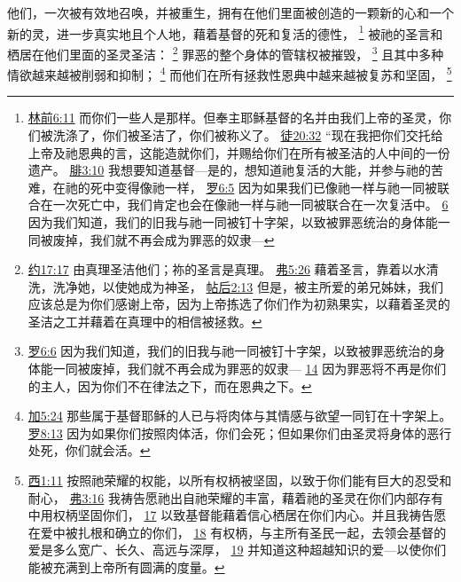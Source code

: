 \documentclass[12pt, a4paper, oneside]{ctexart}
\newcounter{parnum}[section]
\newcommand{\N}{%
   \noindent\refstepcounter{parnum}%
    \makebox[\parindent][l]{\textbf{\arabic{parnum}.}}}
\begin{document}
\N 他们，一次被有效地召唤，并被重生，拥有在他们里面被创造的一颗新的心和一个新的灵，进一步真实地且个人地，藉着基督的死和复活的德性，
	\footnote {
		\href{https://biblehub.com/1_corinthians/6-11.htm}{林前6:11} 而你们一些人是那样。但奉主耶稣基督的名并由我们上帝的圣灵，你们被洗涤了，你们被圣洁了，你们被称义了。
		\href{https://biblehub.com/acts/20-32.htm}{徒20:32} “现在我把你们交托给上帝及祂恩典的言，这能造就你们，并赐给你们在所有被圣洁的人中间的一份遗产。
		\href{https://biblehub.com/philippians/3-10.htm}{腓3:10} 我想要知道基督---是的，想知道祂复活的大能，并参与祂的苦难，在祂的死中变得像祂一样，
		\href{https://biblehub.com/romans/6-5.htm}{罗6:5} 因为如果我们已像祂一样与祂一同被联合在一次死亡中，我们肯定也会在像祂一样与祂一同被联合在一次复活中。
		\href{https://biblehub.com/romans/6-6.htm}{6} 因为我们知道，我们的旧我与祂一同被钉十字架，以致被罪恶统治的身体能一同被废掉，我们就不再会成为罪恶的奴隶---
	}
	被祂的圣言和栖居在他们里面的圣灵圣洁：
	\footnote {
		\href{https://biblehub.com/john/17-17.htm}{约17:17} 由真理圣洁他们；祢的圣言是真理。
		\href{https://biblehub.com/ephesians/5-26.htm}{弗5:26} 藉着圣言，靠着以水清洗，洗净她，以使她成为神圣，
		\href{https://biblehub.com/2_thessalonians/2-13.htm}{帖后2:13} 但是，被主所爱的弟兄姊妹，我们应该总是为你们感谢上帝，因为上帝拣选了你们作为初熟果实，以藉着圣灵的圣洁之工并藉着在真理中的相信被拯救。
	}
	罪恶的整个身体的管辖权被摧毁，
	\footnote {
		\href{https://biblehub.com/romans/6-6.htm}{罗6:6} 因为我们知道，我们的旧我与祂一同被钉十字架，以致被罪恶统治的身体能一同被废掉，我们就不再会成为罪恶的奴隶---
		\href{https://biblehub.com/romans/6-14.htm}{14} 因为罪恶将不再是你们的主人，因为你们不在律法之下，而在恩典之下。
	}
	且其中多种情欲越来越被削弱和抑制；
	\footnote {
		\href{https://biblehub.com/galatians/5-24.htm}{加5:24} 那些属于基督耶稣的人已与将肉体与其情感与欲望一同钉在十字架上。
		\href{https://biblehub.com/romans/8-13.htm}{罗8:13} 因为如果你们按照肉体活，你们会死；但如果你们由圣灵将身体的恶行处死，你们就会活。
	}
	而他们在所有拯救性恩典中越来越被复苏和坚固，
	\footnote {
		\href{https://biblehub.com/colossians/1-11.htm}{西1:11} 按照祂荣耀的权能，以所有权柄被坚固，以致于你们能有巨大的忍受和耐心，
		\href{https://biblehub.com/ephesians/3-16.htm}{弗3:16} 我祷告愿祂出自祂荣耀的丰富，藉着祂的圣灵在你们内部存有中用权柄坚固你们，
		\href{https://biblehub.com/ephesians/3-17.htm}{17} 以致基督能藉着信心栖居在你们内心。并且我祷告愿在爱中被扎根和确立的你们，
		\href{https://biblehub.com/ephesians/3-18.htm}{18} 有权柄，与主所有圣民一起，去领会基督的爱是多么宽广、长久、高远与深厚，
		\href{https://biblehub.com/ephesians/3-19.htm}{19} 并知道这种超越知识的爱---以使你们能被充满到上帝所有圆满的度量。
	}
\end{document}
